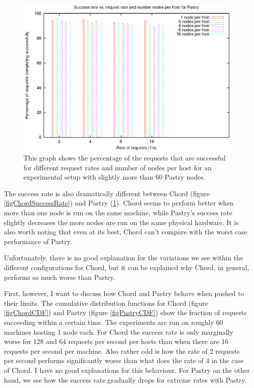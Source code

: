 \begin{figure}[!htbp]
  \begin{center}
    \includegraphics[width=0.9\linewidth]{illustrations/success_rate_pastry.eps}
    \caption{This graph shows the percentage of the requests that are successful for different request rates and number of nodes per host for an experimental setup with slightly more than 60 Pastry nodes.}
    \label{figPastrySuccessRate}
  \end{center}
\end{figure}


The success rate is also dramatically different between Chord (figure \ref{figChordSuccessRate}) and Pastry (\ref{figPastrySuccessRate}). Chord seems to perform better when more than one node is run on the same machine, while Pastry's success rate slightly decreases the more nodes are run on the same physical hardware. It is also worth noting that even at its best, Chord can't compare with the worst case performance of Pastry.

Unfortunately, there is no good explanation for the variations we see within the different configurations for Chord, but it can be explained why Chord, in general, performs so much worse than Pastry.

First, however, I want to discuss how Chord and Pastry behave when pushed to their limits. The cumulative distribution functions for Chord (figure \ref{figChordCDF}) and Pastry (figure \ref{figPastryCDF}) show the fraction of requests succeeding within a certain time. The experiments are run on roughly 60 machines hosting 1 node each. 
For Chord the success rate is only marginally worse for 128 and 64 requests per second per hosts than when there are 16 requests per second per machine. Also rather odd is how the rate of 2 requests per second performs significantly worse than what does the rate of 4 in the case of Chord. I have no good explanations for this behaviour.
For Pastry on the other hand, we see how the success rate gradually drops for extreme rates with Pastry.

